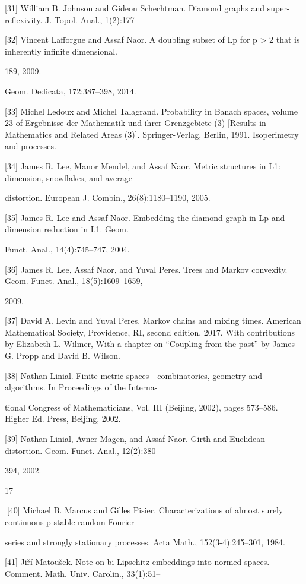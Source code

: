 {[31] William B. Johnson and Gideon Schechtman. Diamond graphs and super-reﬂexivity. J. Topol. Anal., 1(2):177–

[32] Vincent Laﬀorgue and Assaf Naor. A doubling subset of Lp for p > 2 that is inherently inﬁnite dimensional.

189, 2009.

Geom. Dedicata, 172:387–398, 2014.

[33] Michel Ledoux and Michel Talagrand. Probability in Banach spaces, volume 23 of Ergebnisse der Mathematik und
ihrer Grenzgebiete (3) [Results in Mathematics and Related Areas (3)]. Springer-Verlag, Berlin, 1991. Isoperimetry
and processes.

[34] James R. Lee, Manor Mendel, and Assaf Naor. Metric structures in L1: dimension, snowﬂakes, and average

distortion. European J. Combin., 26(8):1180–1190, 2005.

[35] James R. Lee and Assaf Naor. Embedding the diamond graph in Lp and dimension reduction in L1. Geom.

Funct. Anal., 14(4):745–747, 2004.

[36] James R. Lee, Assaf Naor, and Yuval Peres. Trees and Markov convexity. Geom. Funct. Anal., 18(5):1609–1659,

2009.

[37] David A. Levin and Yuval Peres. Markov chains and mixing times. American Mathematical Society, Providence,
RI, second edition, 2017. With contributions by Elizabeth L. Wilmer, With a chapter on “Coupling from the
past” by James G. Propp and David B. Wilson.

[38] Nathan Linial. Finite metric-spaces—combinatorics, geometry and algorithms. In Proceedings of the Interna-

tional Congress of Mathematicians, Vol. III (Beijing, 2002), pages 573–586. Higher Ed. Press, Beijing, 2002.

[39] Nathan Linial, Avner Magen, and Assaf Naor. Girth and Euclidean distortion. Geom. Funct. Anal., 12(2):380–

394, 2002.

17

[40] Michael B. Marcus and Gilles Pisier. Characterizations of almost surely continuous p-stable random Fourier

series and strongly stationary processes. Acta Math., 152(3-4):245–301, 1984.

[41] Jiří Matoušek. Note on bi-Lipschitz embeddings into normed spaces. Comment. Math. Univ. Carolin., 33(1):51–

}
